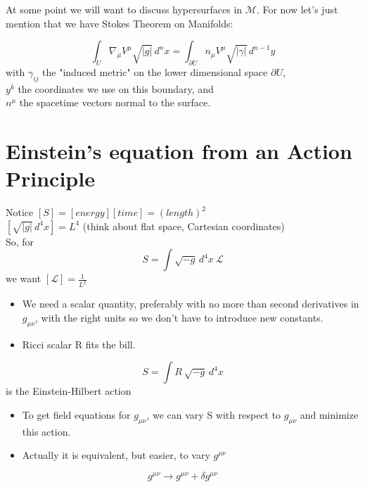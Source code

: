 \documentclass[10pt]{article}
\begin{document}
	\par At some point we will want to discuss hypersurfaces in $\mathcal{M}$. For now let's just mention that 
	we have Stokes Theorem on Manifolds:

	$$\boxed{\int_{U} \nabla_{\mu} V^{\mu} \sqrt{|g|}\,d^{n}x = \int_{\partial U} n_{\mu} V^{\mu} \sqrt{|\gamma|}\,d^{n-1}y}$$
	with $\gamma_{ij}$ the "induced metric" on the lower dimensional space $\partial U$,\\
	$y^{k}$ the coordinates we use on this boundary, and\\
	$n^{\mu}$ the spacetime vectors normal to the surface.\\

	\section{Einstein's equation from an Action Principle}

	Notice $[S] = [energy][time] = (length)^2$\\
	$[\sqrt{|g|}\,d^{4}x] = L^4$	(think about flat space, Cartesian coordinates)\\
	So, for $$S = \int \sqrt{-g}\,d^{4}x \ \mathcal{L}$$   we want $[\mathcal{L}] = \frac{1}{L^2}$\\
	\begin{itemize}[label=*]
	\item We need a scalar quantity, preferably with no more than second derivatives in $g_{\mu \nu}$,
	with the right units so we don't have to introduce new constants.\\
	\item Ricci scalar R fits the bill.\\
	\end{itemize}

	$$\boxed{S = \int R \ \sqrt{-g}\,d^{4}x}$$
	is the Einstein-Hilbert action
	\begin{itemize}[label=*]
	\item To get field equations for $g_{\mu \nu}$, we can vary S with respect to $g_{\mu \nu}$ and minimize
	this action.
	\item Actually it is equivalent, but easier, to vary $g^{\mu \nu}$
	\end{itemize}
	$$g^{\mu \nu} \rightarrow g^{\mu \nu} + \delta g^{\mu \nu}$$
	
\end{document}
